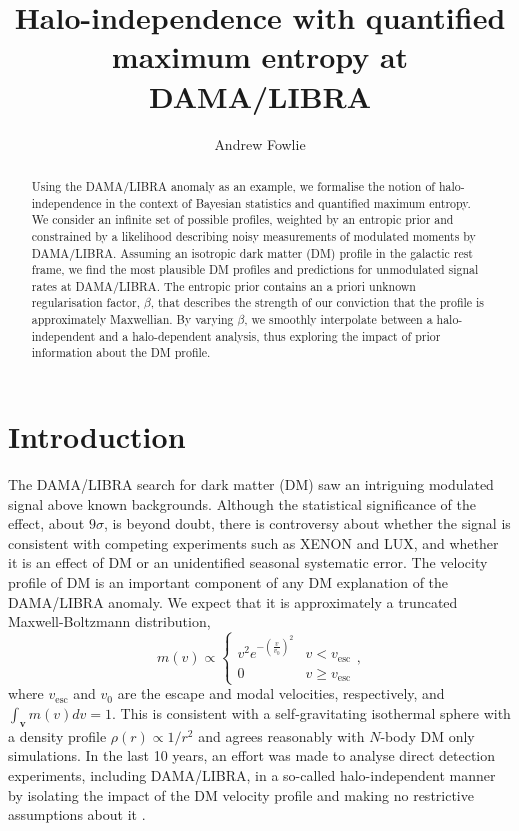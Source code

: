 \documentclass{article}
\title{Halo-independence with quantified maximum entropy at DAMA/LIBRA}
\author{Andrew Fowlie}
\affiliation{ARC Centre of Excellence for Particle Physics at the Tera-scale, Monash University, Melbourne, Victoria 3800, Australia}
\begin{document}
\maketitle

\begin{abstract}
Using the DAMA/LIBRA anomaly as an example, we formalise the notion of halo-independence in the context of Bayesian statistics and quantified maximum entropy. We consider an infinite set of possible profiles, weighted by an entropic prior and constrained by a likelihood describing noisy measurements of modulated moments by DAMA/LIBRA. Assuming an isotropic dark matter (DM) profile in the galactic rest frame, we find the most plausible DM profiles and predictions for unmodulated signal rates at DAMA/LIBRA. The entropic prior contains an a priori unknown regularisation factor, $\beta$, that describes the strength of our conviction that the profile is approximately Maxwellian. By varying $\beta$, we smoothly interpolate between a halo-independent and a halo-dependent analysis, thus exploring the impact of prior information about the DM profile.
\end{abstract}

\section{Introduction}

The DAMA/LIBRA search for dark matter (DM) saw an intriguing modulated signal above known backgrounds\cite{Bernabei:2008yi,Bernabei:2010mq,Bernabei:2013xsa}. Although the statistical significance of the effect, about $9\sigma$, is beyond doubt, there is controversy about whether the signal is consistent with competing experiments such as XENON\cite{Aprile:2017yea,Aprile:2017iyp} and LUX\cite{Akerib:2016lao}, and whether it is an effect of DM or an unidentified seasonal systematic error. The velocity profile of DM is an important component of any DM explanation of the DAMA/LIBRA anomaly. We expect that it is approximately a truncated Maxwell-Boltzmann distribution,
\begin{equation}\label{eq:mb}
m(v) \propto \begin{cases} 
        v^2 e^{-\left(\frac{v}{v_0}\right)^2} & v < v_\text{esc}\\
        0 & v \ge v_\text{esc}
        \end{cases},
\end{equation}
where  $v_\text{esc}$ and $v_0$ are the escape and modal velocities, respectively, and $\int_{\mathbf v} m(v) dv = 1$. This is consistent with a self-gravitating isothermal sphere with a  density profile $\rho(r) \propto 1 /r^2$ and agrees reasonably with $N$-body DM only simulations\cite{Kuhlen:2009vh}. In the last 10 years, an effort was made to analyse direct detection experiments, including DAMA/LIBRA, in a so-called halo-independent manner by isolating the impact of the DM velocity profile and making no restrictive assumptions about it . 
\end{document}
